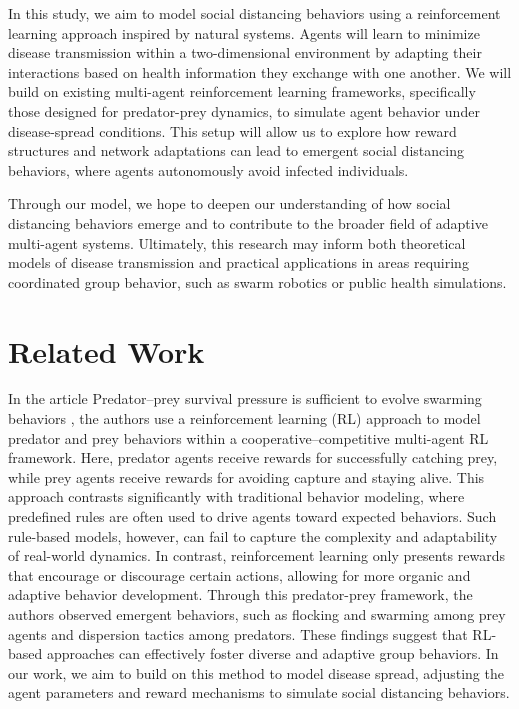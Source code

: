 \documentclass[9pt]{IEEEtran}
\begin{document}
In this study, we aim to model social distancing behaviors using a reinforcement learning approach inspired by natural systems. Agents will learn to minimize disease transmission within a two-dimensional environment by adapting their interactions based on health information they exchange with one another. We will build on existing multi-agent reinforcement learning frameworks, specifically those designed for predator-prey dynamics, to simulate agent behavior under disease-spread conditions. This setup will allow us to explore how reward structures and network adaptations can lead to emergent social distancing behaviors, where agents autonomously avoid infected individuals.

Through our model, we hope to deepen our understanding of how social distancing behaviors emerge and to contribute to the broader field of adaptive multi-agent systems. Ultimately, this research may inform both theoretical models of disease transmission and practical applications in areas requiring coordinated group behavior, such as swarm robotics or public health simulations.

\section{Related Work}

In the article Predator–prey survival pressure is sufficient to evolve swarming behaviors \cite{li2023predator}, the authors use a reinforcement learning (RL) approach to model predator and prey behaviors within a cooperative–competitive multi-agent RL framework. Here, predator agents receive rewards for successfully catching prey, while prey agents receive rewards for avoiding capture and staying alive. This approach contrasts significantly with traditional behavior modeling, where predefined rules are often used to drive agents toward expected behaviors. Such rule-based models, however, can fail to capture the complexity and adaptability of real-world dynamics. In contrast, reinforcement learning only presents rewards that encourage or discourage certain actions, allowing for more organic and adaptive behavior development. Through this predator-prey framework, the authors observed emergent behaviors, such as flocking and swarming among prey agents and dispersion tactics among predators. These findings suggest that RL-based approaches can effectively foster diverse and adaptive group behaviors. In our work, we aim to build on this method to model disease spread, adjusting the agent parameters and reward mechanisms to simulate social distancing behaviors.
\end{document}

